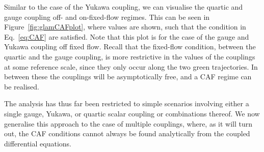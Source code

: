 Similar to the case of the Yukawa coupling, we can visualise the quartic and gauge coupling off- and on-fixed-flow regimes. This can be seen in Figure~\ref{fig:glamCAFplot}, where values are shown, such that the condition in Eq.~\eqref{eq:CAF} are satisfied. Note that this plot is for the case of the gauge and Yukawa coupling off fixed flow. Recall that the fixed-flow condition, between the quartic and the gauge coupling, is more restrictive in the values of the couplings at some reference scale, since they only occur along the two green trajectories. In between these the couplings will be asymptotically free, and a CAF regime can be realised.  

The analysis has thus far been restricted to simple scenarios involving either a single gauge, Yukawa, or quartic scalar coupling or combinations thereof. We now generalise this approach to the case of multiple couplings, where, as it will turn out, the CAF conditions cannot always be found analytically from the coupled differential equations. 